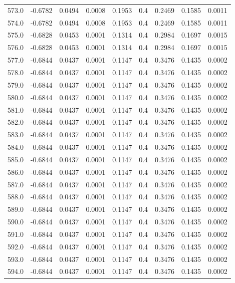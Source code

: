 \begin{longtable}{lrrrrrrrr}
573.0 & -0.6782 & 0.0494 & 0.0008 & 0.1953 & 0.4 & 0.2469 & 0.1585 & 0.0011 \\
574.0 & -0.6782 & 0.0494 & 0.0008 & 0.1953 & 0.4 & 0.2469 & 0.1585 & 0.0011 \\
575.0 & -0.6828 & 0.0453 & 0.0001 & 0.1314 & 0.4 & 0.2984 & 0.1697 & 0.0015 \\
576.0 & -0.6828 & 0.0453 & 0.0001 & 0.1314 & 0.4 & 0.2984 & 0.1697 & 0.0015 \\
577.0 & -0.6844 & 0.0437 & 0.0001 & 0.1147 & 0.4 & 0.3476 & 0.1435 & 0.0002 \\
578.0 & -0.6844 & 0.0437 & 0.0001 & 0.1147 & 0.4 & 0.3476 & 0.1435 & 0.0002 \\
579.0 & -0.6844 & 0.0437 & 0.0001 & 0.1147 & 0.4 & 0.3476 & 0.1435 & 0.0002 \\
580.0 & -0.6844 & 0.0437 & 0.0001 & 0.1147 & 0.4 & 0.3476 & 0.1435 & 0.0002 \\
581.0 & -0.6844 & 0.0437 & 0.0001 & 0.1147 & 0.4 & 0.3476 & 0.1435 & 0.0002 \\
582.0 & -0.6844 & 0.0437 & 0.0001 & 0.1147 & 0.4 & 0.3476 & 0.1435 & 0.0002 \\
583.0 & -0.6844 & 0.0437 & 0.0001 & 0.1147 & 0.4 & 0.3476 & 0.1435 & 0.0002 \\
584.0 & -0.6844 & 0.0437 & 0.0001 & 0.1147 & 0.4 & 0.3476 & 0.1435 & 0.0002 \\
585.0 & -0.6844 & 0.0437 & 0.0001 & 0.1147 & 0.4 & 0.3476 & 0.1435 & 0.0002 \\
586.0 & -0.6844 & 0.0437 & 0.0001 & 0.1147 & 0.4 & 0.3476 & 0.1435 & 0.0002 \\
587.0 & -0.6844 & 0.0437 & 0.0001 & 0.1147 & 0.4 & 0.3476 & 0.1435 & 0.0002 \\
588.0 & -0.6844 & 0.0437 & 0.0001 & 0.1147 & 0.4 & 0.3476 & 0.1435 & 0.0002 \\
589.0 & -0.6844 & 0.0437 & 0.0001 & 0.1147 & 0.4 & 0.3476 & 0.1435 & 0.0002 \\
590.0 & -0.6844 & 0.0437 & 0.0001 & 0.1147 & 0.4 & 0.3476 & 0.1435 & 0.0002 \\
591.0 & -0.6844 & 0.0437 & 0.0001 & 0.1147 & 0.4 & 0.3476 & 0.1435 & 0.0002 \\
592.0 & -0.6844 & 0.0437 & 0.0001 & 0.1147 & 0.4 & 0.3476 & 0.1435 & 0.0002 \\
593.0 & -0.6844 & 0.0437 & 0.0001 & 0.1147 & 0.4 & 0.3476 & 0.1435 & 0.0002 \\
594.0 & -0.6844 & 0.0437 & 0.0001 & 0.1147 & 0.4 & 0.3476 & 0.1435 & 0.0002 \\

\end{longtable}
